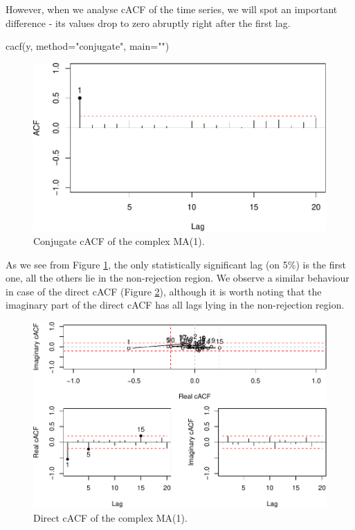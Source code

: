 \documentclass[
]{book}
\newenvironment{Shaded}{\begin{snugshade}}{\end{snugshade}}
\newcommand{\AttributeTok}[1]{\textcolor[rgb]{0.77,0.63,0.00}{#1}}
\newcommand{\FunctionTok}[1]{\textcolor[rgb]{0.00,0.00,0.00}{#1}}
\newcommand{\NormalTok}[1]{#1}
\newcommand{\StringTok}[1]{\textcolor[rgb]{0.31,0.60,0.02}{#1}}
\begin{document}
However, when we analyse cACF of the time series, we will spot an important difference - its values drop to zero abruptly right after the first lag.

\begin{Shaded}
\begin{Highlighting}[]
\FunctionTok{cacf}\NormalTok{(y, }\AttributeTok{method=}\StringTok{"conjugate"}\NormalTok{, }\AttributeTok{main=}\StringTok{""}\NormalTok{)}
\end{Highlighting}
\end{Shaded}

\begin{figure}
\centering
\includegraphics{Svetunkov---Svetunkov---Complex-Valued-Econometrics_files/figure-latex/complexMA1cACF-1.pdf}
\caption{\label{fig:complexMA1cACF}Conjugate cACF of the complex MA(1).}
\end{figure}

As we see from Figure \ref{fig:complexMA1cACF}, the only statistically significant lag (on 5\%) is the first one, all the others lie in the non-rejection region. We observe a similar behaviour in case of the direct cACF (Figure \ref{fig:complexMA1cACFDir}), although it is worth noting that the imaginary part of the direct cACF has all lags lying in the non-rejection region.

\begin{figure}
\centering
\includegraphics{Svetunkov---Svetunkov---Complex-Valued-Econometrics_files/figure-latex/complexMA1cACFDir-1.pdf}
\caption{\label{fig:complexMA1cACFDir}Direct cACF of the complex MA(1).}
\end{figure}
\end{document}
